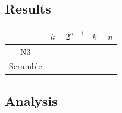 \subsection{Results}
\label{Exp:Res}
\begin{table}[t]
  \begin{center}
    \begin{tabular}{c|c|c}\hline
               & $k=2^{n-1}$ & $k=n$ \\\hline
      N3       &             &       \\\hline
      Scramble &             &       \\\hline
    \end{tabular}
  \end{center}
\end{table}

\subsection{Analysis}
\label{Exp:An}
